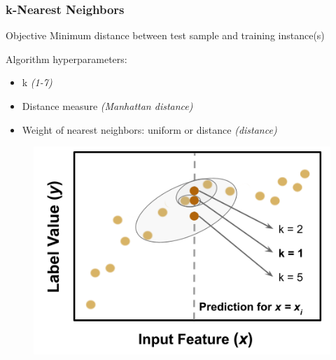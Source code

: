 \begin{frame}
  \frametitle{k-Nearest Neighbors}
  \begin{adjustwidth}{-10pt}{0pt}
  \begin{minipage}{0.5\textwidth}
    \begin{block}{Objective}
      Minimum distance between test sample and training instance(s)
    \end{block}
    \begin{block}{Algorithm hyperparameters:}
      \begin{itemize}
        \item k \textit{(1-7)}
        \item Distance measure \textit{(Manhattan distance)}
        \item Weight of nearest neighbors: uniform or distance \textit{(distance)}
      \end{itemize}
    \end{block}
  \end{minipage}
  \hfill
  \begin{minipage}{0.5\textwidth}
    \begin{figure}
      \centering
      \includegraphics[height=0.5\textheight]{./figures/nn-fig.png}
    \end{figure}
  \end{minipage}
  \end{adjustwidth}
\end{frame}

